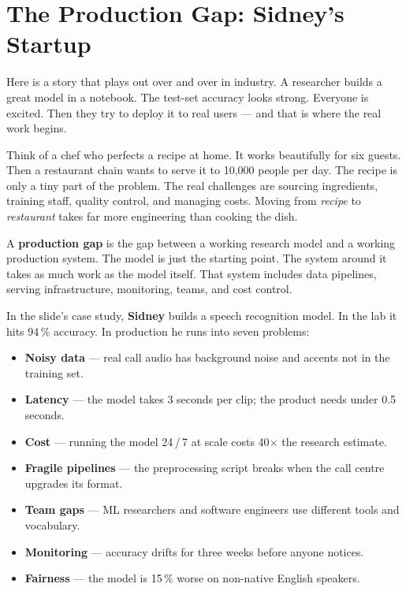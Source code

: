 \documentclass[a4paper,11pt]{article}
\newcommand{\vocab}[1]{\textbf{\color{navy}#1}}
\begin{document}
\section{The Production Gap: Sidney's Startup}

Here is a story that plays out over and over in industry.
A researcher builds a great model in a notebook.
The test-set accuracy looks strong.
Everyone is excited.
Then they try to deploy it to real users --- and that is where the real work begins.

\begin{everyday}
Think of a chef who perfects a recipe at home.
It works beautifully for six guests.
Then a restaurant chain wants to serve it to 10{,}000 people per day.
The recipe is only a tiny part of the problem.
The real challenges are sourcing ingredients, training staff, quality control, and managing costs.
Moving from \emph{recipe} to \emph{restaurant} takes far more engineering than cooking the dish.
\end{everyday}

\begin{intuition}
A \vocab{production gap} is the gap between a working research model and a working production system.
The model is just the starting point.
The system around it takes as much work as the model itself.
That system includes data pipelines, serving infrastructure, monitoring, teams, and cost control.
\end{intuition}

In the slide's case study, \vocab{Sidney} builds a speech recognition model.
In the lab it hits 94\,\% accuracy.
In production he runs into seven problems:

\begin{itemize}
  \item \textbf{Noisy data} --- real call audio has background noise and accents not in the training set.
  \item \textbf{Latency} --- the model takes 3 seconds per clip; the product needs under 0.5 seconds.
  \item \textbf{Cost} --- running the model 24\,/\,7 at scale costs 40$\times$ the research estimate.
  \item \textbf{Fragile pipelines} --- the preprocessing script breaks when the call centre upgrades its format.
  \item \textbf{Team gaps} --- ML researchers and software engineers use different tools and vocabulary.
  \item \textbf{Monitoring} --- accuracy drifts for three weeks before anyone notices.
  \item \textbf{Fairness} --- the model is 15\,\% worse on non-native English speakers.
\end{itemize}
\end{document}
